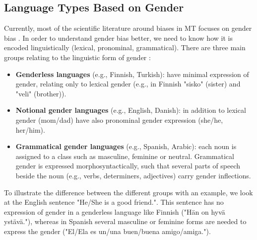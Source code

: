 \subsection{Language Types Based on Gender}
\label{sec:Background:Language}
Currently, most of the scientific literature around biases in MT focuses on gender bias \parencite{Savoldi_2021}. In order to understand gender bias better, we need to know how it is encoded linguistically (lexical, pronominal, grammatical). There are three main groups relating to the linguistic form of gender \parencite{Savoldi_2021}:
\begin{itemize}
    \item \textbf{Genderless languages} (e.g., Finnish, Turkish): have minimal expression of gender, relating only to lexical gender (e.g., in Finnish "sisko" (sister) and "veli" (brother)).
    \item \textbf{Notional gender languages} (e.g., English, Danish): in addition to lexical gender (mom/dad) have also pronominal gender expression (she/he, her/him).
    \item \textbf{Grammatical gender languages} (e.g., Spanish, Arabic): each noun is assigned to a class such as masculine, feminine or neutral. Grammatical gender is expressed morphosyntactically, such that several parts of speech beside the noun (e.g., verbs, determiners, adjectives) carry gender inflections.
\end{itemize}

To illustrate the difference between the different groups with an example, we look at the English sentence "He/She is a good friend.". This sentence has no expression of gender in a genderless language like Finnish ("Hän on hyvä ystävä."), whereas in Spanish several masculine or feminine forms are needed to express the gender ("El/Ela es un/una buen/buena amigo/amiga."). 

